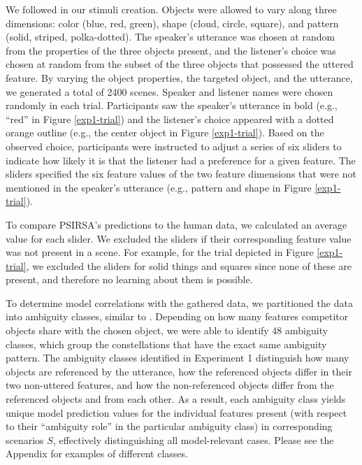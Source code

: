 \documentclass[11pt,a4paper]{article}
\begin{document}
We followed  in our stimuli creation. Objects were allowed to vary along three dimensions: color (blue, red, green), shape (cloud, circle, square), and pattern (solid, striped, polka-dotted). The speaker's utterance was chosen at random from the properties of the three objects present, and the listener's choice was chosen at random from the subset of the three objects that possessed the uttered feature. By varying the object properties, the targeted object, and the utterance, we generated a total of 2400 scenes. Speaker and listener names were chosen randomly in each trial. Participants saw the speaker's utterance in bold (e.g., ``red'' in Figure \ref{exp1-trial}) and the listener's choice appeared with a dotted orange outline (e.g., the center object in Figure \ref{exp1-trial}). Based on the observed choice, participants were instructed to adjust a series of six sliders to indicate how likely it is that the listener had a preference for a given feature. The sliders specified the six feature values of the two feature dimensions that were not mentioned in the speaker's utterance (e.g., pattern and shape in Figure \ref{exp1-trial}). 

To compare PSIRSA's predictions to the human data, we calculated an average value for each slider.
We excluded the sliders if their corresponding feature value was not present in a scene. For example, for the trial depicted in Figure \ref{exp1-trial}, we excluded the sliders for solid things and squares since none of these are present, and therefore no learning about them is possible.

To determine model correlations with the gathered data, we partitioned the data into ambiguity classes, similar to . Depending on how many features competitor objects share with the chosen object, we were able to identify 48 ambiguity classes, which group the constellations that have the exact same ambiguity pattern. The ambiguity classes identified in Experiment 1 distinguish how many objects are referenced by the utterance, how the referenced objects differ in their two non-uttered features, and how the non-referenced objects differ from the referenced objects and from each other.
As a result, each ambiguity class yields unique model prediction values for the individual features present (with respect to their ``ambiguity role'' in the particular ambiguity class) in corresponding scenarios $S$, effectively distinguishing all model-relevant cases. Please see the Appendix for examples of different classes.
\end{document}
